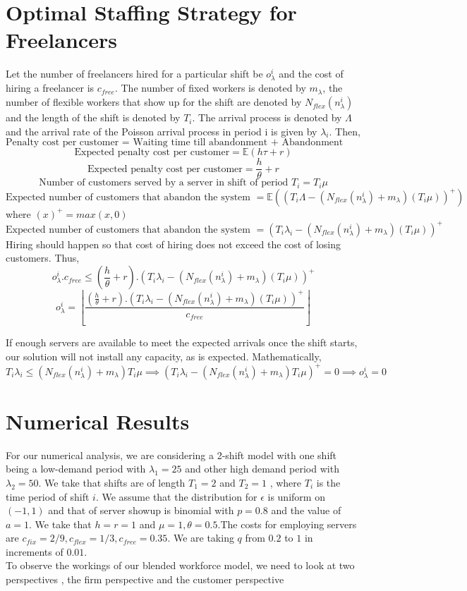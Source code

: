 \section{Optimal Staffing Strategy for Freelancers} 
Let the number of freelancers hired for a particular shift be $o_{\lambda}^i$ and the cost of hiring a freelancer is $c_{free}$. The number of fixed workers is denoted by $m_{\lambda}$, the number of flexible workers that show up for the shift are denoted by $N_{flex}(n_{\lambda}^i)$ and the length of the shift is denoted by $T_i$. The arrival process is denoted by $\Lambda$ and the arrival rate of the Poisson arrival process in period i is given by $\lambda_i$.
Then, \\
\[\text{Penalty cost per customer = Waiting time till abandonment + Abandonment cost}\]
\[\text{Expected penalty cost per customer}=\mathbb{E}(h\tau+r)\]
\[\text{Expected penalty cost per customer} =\frac{h}{\theta} + r\]
\[\text{Number of customers served by a server in shift of period $T_i$} = T_i\mu\]
\[\text{Expected number of customers that abandon the system }=\mathbb{E}((T_i\Lambda - (N_{flex}(n_{\lambda}^i) + m_{\lambda})(T_i\mu))^+)\]
\hspace{9cm} where $(x)^+=max(x,0)$
\[\text{Expected number of customers  that abandon the system }=(T_i\lambda_i - (N_{flex}(n_{\lambda}^i) + m_{\lambda})(T_i\mu))^+\]
Hiring should happen so that cost of hiring does not exceed the cost of losing customers. Thus, 
\[o_{\lambda}^i.c_{free}\leq (\frac{h}{\theta} + r).(T_i\lambda_i - (N_{flex}(n_{\lambda}^i) + m_{\lambda})(T_i\mu))^+\]
\[o_{\lambda}^i = \left \lfloor{\frac{(\frac{h}{\theta} + r).(T_i\lambda_i - (N_{flex}(n_{\lambda}^i) + m_{\lambda})(T_i\mu))^+}{c_{free}}}\right \rfloor \]

\begin{remark}
If enough servers are available to meet the expected arrivals once the shift starts, our solution will not install any capacity, as is expected. Mathematically, 
\[T_i\lambda_i \leq (N_{flex}(n_{\lambda}^i) + m_{\lambda})T_i\mu \implies (T_i\lambda_i - (N_{flex}(n_{\lambda}^i) + m_{\lambda})T_i\mu)^+=0 \implies o_{\lambda}^i=0\]

\end{remark}

\section{Numerical Results}
For our numerical analysis, we are considering a 2-shift model with one shift being a low-demand period with $\lambda_1=25$ and other high demand period with $\lambda_2=50$. We take that shifts are of length $T_1=2$ and $T_2=1$ , where $T_i$ is the time period of shift $i$. We assume that the distribution for $\epsilon$ is uniform on $(-1,1)$ and that of server showup is binomial with $p=0.8$ and the value of $a=1$. We take that $h=r=1$ and $\mu=1,\theta=0.5$.The costs for employing servers are $c_{fix}=2/9,c_{flex}=1/3,c_{free}=0.35$. We are taking $q$ from $0.2$ to $1$ in increments of $0.01$.
\\ To observe the workings of our blended workforce model, we need to look at two perspectives , the firm perspective and the customer perspective
